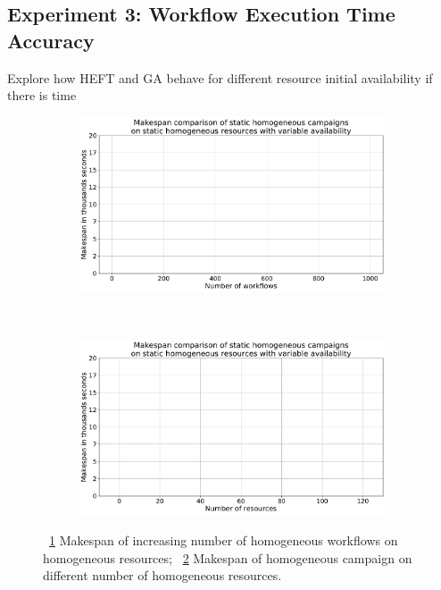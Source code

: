 \subsection{Experiment 3: Workflow Execution Time Accuracy}

Explore how HEFT and GA behave for different resource initial availability if there is time
\begin{figure}[ht!]
    \centering
    \begin{subfigure}[b]{0.45\textwidth}
        \includegraphics[width=.95\textwidth]{figures/campaign/StHomoCampaigns_4VarHomoResources.pdf}
        \caption{}
        \label{fig:StHomoCampaigns_4VarHomoResources}
    \end{subfigure}%
    ~ 
    \begin{subfigure}[b]{0.45\textwidth}
        \includegraphics[width=\linewidth]{figures/campaign/VarHomoResources_StHomoCampaigns.pdf}
        \caption{}
        \label{fig:VarHomoResources_StHomoCampaigns}
    \end{subfigure}
    \caption{~\ref{fig:StHomoCampaigns_4VarHomoResources} Makespan of increasing number of homogeneous workflows on homogeneous resources;
    ~\ref{fig:VarHomoResources_StHomoCampaigns} Makespan of homogeneous campaign on different number of homogeneous resources.}
    \label{fig:resource_avail}
\end{figure}

